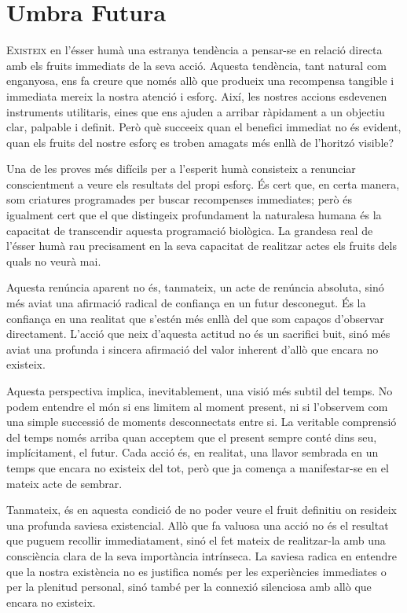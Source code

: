 \chapter{Umbra Futura}


\lettrine[loversize=0.2, lines=2]{E}{xisteix} en l'ésser humà una estranya tendència a pensar-se en relació directa amb els fruits immediats de la seva acció. Aquesta tendència, tant natural com enganyosa, ens fa creure que només allò que produeix una recompensa tangible i immediata mereix la nostra atenció i esforç. Així, les nostres accions esdevenen instruments utilitaris, eines que ens ajuden a arribar ràpidament a un objectiu clar, palpable i definit. Però què succeeix quan el benefici immediat no és evident, quan els fruits del nostre esforç es troben amagats més enllà de l'horitzó visible?

Una de les proves més difícils per a l’esperit humà consisteix a renunciar conscientment a veure els resultats del propi esforç. És cert que, en certa manera, som criatures programades per buscar recompenses immediates; però és igualment cert que el que distingeix profundament la naturalesa humana és la capacitat de transcendir aquesta programació biològica. La grandesa real de l'ésser humà rau precisament en la seva capacitat de realitzar actes els fruits dels quals no veurà mai.

Aquesta renúncia aparent no és, tanmateix, un acte de renúncia absoluta, sinó més aviat una afirmació radical de confiança en un futur desconegut. És la confiança en una realitat que s'estén més enllà del que som capaços d'observar directament. L'acció que neix d’aquesta actitud no és un sacrifici buit, sinó més aviat una profunda i sincera afirmació del valor inherent d'allò que encara no existeix.

Aquesta perspectiva implica, inevitablement, una visió més subtil del temps. No podem entendre el món si ens limitem al moment present, ni si l’observem com una simple successió de moments desconnectats entre si. La veritable comprensió del temps només arriba quan acceptem que el present sempre conté dins seu, implícitament, el futur. Cada acció és, en realitat, una llavor sembrada en un temps que encara no existeix del tot, però que ja comença a manifestar-se en el mateix acte de sembrar.

Tanmateix, és en aquesta condició de no poder veure el fruit definitiu on resideix una profunda saviesa existencial. Allò que fa valuosa una acció no és el resultat que puguem recollir immediatament, sinó el fet mateix de realitzar-la amb una consciència clara de la seva importància intrínseca. La saviesa radica en entendre que la nostra existència no es justifica només per les experiències immediates o per la plenitud personal, sinó també per la connexió silenciosa amb allò que encara no existeix.

